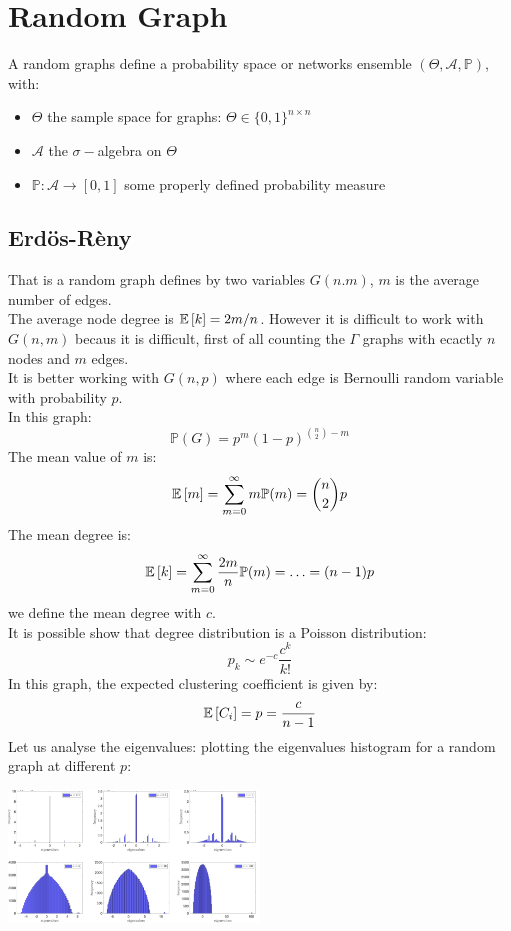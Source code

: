 \section{Random Graph}
A random graphs define a probability space or networks ensemble $(\Theta, \mathcal{A}, \mathbb{P})$, with:
\begin{itemize}
	\item $\Theta$ the sample space for graphs: $\Theta \in \{0,1\}^{n \times n}$
	\item $\mathcal{A}$ the $\sigma-$algebra on $\Theta$
	\item $\mathbb{P}: \mathcal{A} \to [0,1]$ some properly defined probability measure
\end{itemize}
\subsection{Erd\"{o}s-Rèny}
That is a random graph defines by two variables $G(n.m)$, $m$ is the average number of edges.\\
The average node degree is $\mathbb{E}\left[k\right] = 2m/n$. However it is difficult to work with $G(n,m)$ becaus it is difficult, first of all counting the $\Gamma$ graphs with ecactly $n$ nodes and $m$ edges.\\
It is better working with $G(n,p)$ where each edge is Bernoulli random variable with probability $p$.\\
In this graph:
\[
\mathbb{P}(G) = p^m (1-p)^{{n \choose 2} -m}
\]
The mean value of $m$ is:
\[
\mathbb{E}\left[m\right] = \sum_{m=0}^{\infty} m\mathbb{P}(m) = {n \choose 2} p
\]
The mean degree is:
\[
\mathbb{E}\left[k\right] = \sum_{m =0}^{\infty} \frac{2m}{n} \mathbb{P}(m) = \ldots = (n-1)p
\]
we define the mean degree with $c$.\\
It is possible show that degree distribution is a Poisson distribution:
\[
p_k \sim e^{-c} \frac{c^k}{k!}
\]
In this graph, the expected clustering coefficient is given by:
\[
\mathbb{E}\left[C_i\right] =p= \frac{c}{n-1}
\]
Let us analyse the eigenvalues: plotting the eigenvalues histogram for a random graph at different $p$:
\begin{center}
	\includegraphics[width=0.5\textwidth]{picture/(42)eigenvalues_random.png}
\end{center}
